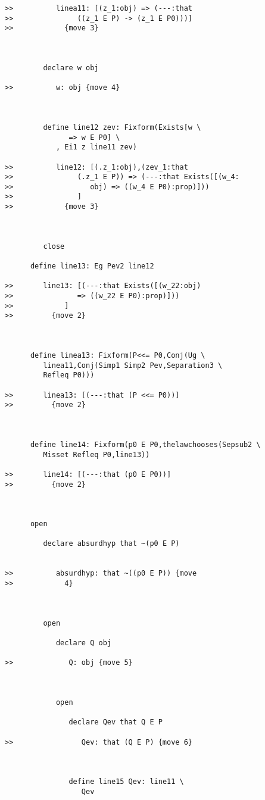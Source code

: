 \documentclass[12pt]{article}
\begin{document}
\begin{verbatim}
>>          linea11: [(z_1:obj) => (---:that
>>               ((z_1 E P) -> (z_1 E P0)))]
>>            {move 3}



         declare w obj

>>          w: obj {move 4}



         define line12 zev: Fixform(Exists[w \
               => w E P0] \
            , Ei1 z line11 zev)

>>          line12: [(.z_1:obj),(zev_1:that
>>               (.z_1 E P)) => (---:that Exists([(w_4:
>>                  obj) => ((w_4 E P0):prop)]))
>>               ]
>>            {move 3}



         close

      define line13: Eg Pev2 line12

>>       line13: [(---:that Exists([(w_22:obj)
>>               => ((w_22 E P0):prop)]))
>>            ]
>>         {move 2}



      define linea13: Fixform(P<<= P0,Conj(Ug \
         linea11,Conj(Simp1 Simp2 Pev,Separation3 \
         Refleq P0)))

>>       linea13: [(---:that (P <<= P0))]
>>         {move 2}



      define line14: Fixform(p0 E P0,thelawchooses(Sepsub2 \
         Misset Refleq P0,line13))

>>       line14: [(---:that (p0 E P0))]
>>         {move 2}



      open

         declare absurdhyp that ~(p0 E P)


>>          absurdhyp: that ~((p0 E P)) {move
>>            4}



         open

            declare Q obj

>>             Q: obj {move 5}



            open

               declare Qev that Q E P

>>                Qev: that (Q E P) {move 6}



               define line15 Qev: line11 \
                  Qev


\end{verbatim}
\end{document}

